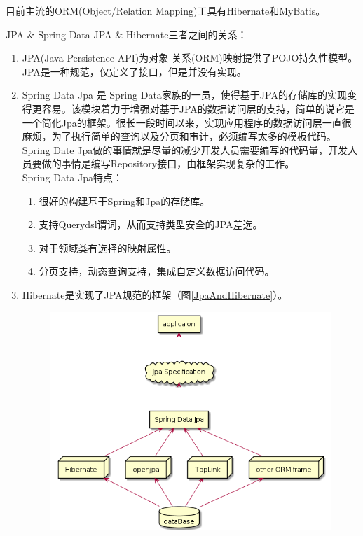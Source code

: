 目前主流的ORM(Object/Relation Mapping)工具有Hibernate和MyBatis。

JPA \& Spring Data JPA \& Hibernate三者之间的关系：
\begin{enumerate}
    \item JPA(Java Persistence API)为对象-关系(ORM)映射提供了POJO持久性模型。JPA是一种规范，仅定义了接口，但是并没有实现。
    \item Spring Data Jpa 是 Spring Data家族的一员，使得基于JPA的存储库的实现变得更容易。该模块着力于增强对基于JPA的数据访问层的支持，简单的说它是一个简化Jpa的框架。很长一段时间以来，实现应用程序的数据访问层一直很麻烦，为了执行简单的查询以及分页和审计，必须编写太多的模板代码。Spring Date Jpa做的事情就是尽量的减少开发人员需要编写的代码量，开发人员要做的事情是编写Repository接口，由框架实现复杂的工作。\\
          Spring Data Jpa特点：
          \begin{enumerate}
              \item 很好的构建基于Spring和Jpa的存储库。
              \item 支持Querydsl谓词，从而支持类型安全的JPA差选。
              \item 对于领域类有选择的映射属性。
              \item 分页支持，动态查询支持，集成自定义数据访问代码。
          \end{enumerate}
    \item Hibernate是实现了JPA规范的框架（图\ref{JpaAndHibernate}）。
          \begin{figure}[h]
              \centering
              \includegraphics[scale = 0.6]{out/uml/部署图/Jpa和Hibernate/Jpa和Hibernate.png}

\end{figure}
\end{enumerate}
